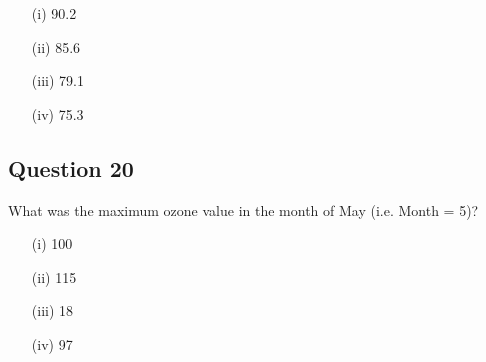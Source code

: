 \documentclass[12pt]{article}
\begin{document}
\begin{itemize}
	\item[(i)] 90.2
	\item[(ii)] 85.6
	\item[(iii)] 79.1
	\item[(iv)] 75.3
\end{itemize}

\subsection*{Question 20}
\Large
What was the maximum ozone value in the month of May (i.e. Month = 5)?


\begin{itemize}
	\item[(i)] 100
	\item[(ii)] 115
	\item[(iii)] 18
	\item[(iv)] 97
\end{itemize}
\end{document}
